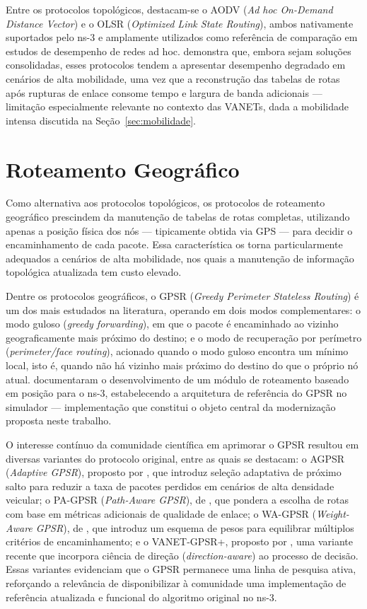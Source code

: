Entre os protocolos topológicos, destacam-se o AODV (\textit{Ad hoc On-Demand Distance
Vector}) e o OLSR (\textit{Optimized Link State Routing}), ambos nativamente suportados pelo
ns-3 e amplamente utilizados como referência de comparação em estudos de desempenho de redes
ad hoc.  demonstra que, embora sejam soluções consolidadas,
esses protocolos tendem a apresentar desempenho degradado em cenários de alta mobilidade, uma
vez que a reconstrução das tabelas de rotas após rupturas de enlace consome tempo e largura
de banda adicionais — limitação especialmente relevante no contexto das VANETs, dada a
mobilidade intensa discutida na Seção~\ref{sec:mobilidade}.

\section{Roteamento Geográfico}
\label{sec:roteamento-geografico}

Como alternativa aos protocolos topológicos, os protocolos de roteamento geográfico
prescindem da manutenção de tabelas de rotas completas, utilizando apenas a posição física
dos nós — tipicamente obtida via GPS — para decidir o encaminhamento de cada pacote. Essa
característica os torna particularmente adequados a cenários de alta mobilidade, nos quais a
manutenção de informação topológica atualizada tem custo elevado.

Dentre os protocolos geográficos, o GPSR (\textit{Greedy Perimeter Stateless Routing}) é um
dos mais estudados na literatura, operando em dois modos complementares: o modo guloso
(\textit{greedy forwarding}), em que o pacote é encaminhado ao vizinho geograficamente mais
próximo do destino; e o modo de recuperação por perímetro (\textit{perimeter/face routing}),
acionado quando o modo guloso encontra um mínimo local, isto é, quando não há vizinho mais
próximo do destino do que o próprio nó atual. 
documentaram o desenvolvimento de um módulo de roteamento baseado em posição para o ns-3,
estabelecendo a arquitetura de referência do GPSR no simulador — implementação que constitui
o objeto central da modernização proposta neste trabalho.

O interesse contínuo da comunidade científica em aprimorar o GPSR resultou em diversas
variantes do protocolo original, entre as quais se destacam: o AGPSR
(\textit{Adaptive GPSR}), proposto por , que introduz seleção
adaptativa de próximo salto para reduzir a taxa de pacotes perdidos em cenários de alta
densidade veicular; o PA-GPSR (\textit{Path-Aware GPSR}), de , que
pondera a escolha de rotas com base em métricas adicionais de qualidade de enlace; o WA-GPSR
(\textit{Weight-Aware GPSR}), de , que introduz um esquema de
pesos para equilibrar múltiplos critérios de encaminhamento; e o VANET-GPSR+, proposto por
, uma variante recente que incorpora ciência de direção
(\textit{direction-aware}) ao processo de decisão. Essas variantes evidenciam que o GPSR
permanece uma linha de pesquisa ativa, reforçando a relevância de disponibilizar à comunidade
uma implementação de referência atualizada e funcional do algoritmo original no ns-3.

